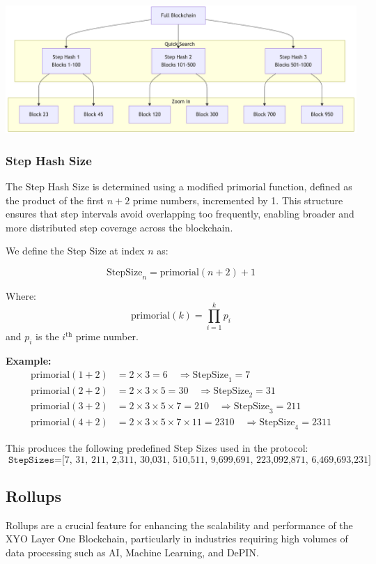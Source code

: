 \documentclass{article}
\begin{document}
\begin{center}
    \includegraphics[width=15cm]{step-hash.png}
\end{center}

\subsubsection{Step Hash Size}

The Step Hash Size is determined using a modified primorial function, defined as the product of the first \(n+2\) prime numbers, incremented by 1. This structure ensures that step intervals avoid overlapping too frequently, enabling broader and more distributed step coverage across the blockchain.

We define the Step Size at index \(n\) as:

\[
    \text{StepSize}_n = \text{primorial}(n+2) + 1
\]

Where:
\[
    \text{primorial}(k) = \prod_{i=1}^{k} p_i
\]
and \(p_i\) is the \(i^\text{th}\) prime number.

\textbf{Example:}
\begin{align*}
\text{primorial}(1+2) &= 2 \times 3 = 6 \quad \Rightarrow \text{StepSize}_1 = 7 \\
\text{primorial}(2+2) &= 2 \times 3 \times 5 = 30 \quad \Rightarrow \text{StepSize}_2 = 31 \\
\text{primorial}(3+2) &= 2 \times 3 \times 5 \times 7 = 210 \quad \Rightarrow \text{StepSize}_3 = 211 \\
\text{primorial}(4+2) &= 2 \times 3 \times 5 \times 7 \times 11 = 2310 \quad \Rightarrow \text{StepSize}_4 = 2311
\end{align*}

This produces the following predefined Step Sizes used in the protocol:
\[
\texttt{StepSizes} = \text{[7, 31, 211, 2,311, 30,031, 510,511, 9,699,691, 223,092,871, 6,469,693,231]}
\]

\subsection{Rollups}
Rollups are a crucial feature for enhancing the scalability and performance of the XYO Layer One Blockchain, particularly in industries requiring high volumes of data processing such as AI, Machine Learning, and DePIN. 
\end{document}

